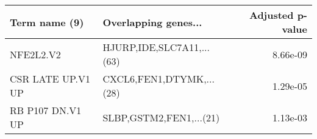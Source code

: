 \begin{tabular}{llr}
\toprule
    Term name (9) &      Overlapping genes... &  Adjusted p-value \\
\midrule
        NFE2L2.V2 & HJURP,IDE,SLC7A11,...(63) &          8.66e-09 \\
CSR LATE UP.V1 UP &  CXCL6,FEN1,DTYMK,...(28) &          1.29e-05 \\
 RB P107 DN.V1 UP &   SLBP,GSTM2,FEN1,...(21) &          1.13e-03 \\
\bottomrule
\end{tabular}
